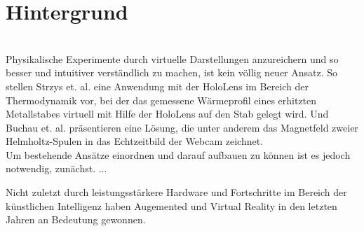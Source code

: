 \section{Hintergrund}
\label{sec-2}
\\


Physikalische Experimente durch virtuelle Darstellungen anzureichern und so besser und intuitiver verständlich zu machen, ist kein völlig neuer Ansatz. So stellen Strzys et. al. eine Anwendung mit der HoloLens im Bereich der Thermodynamik vor, bei der das gemessene Wärmeprofil eines erhitzten Metallstabes virtuell mit Hilfe der HoloLens auf den Stab gelegt wird. \cite{Strzys17} Und Buchau et. al. präsentieren eine Lösung, die unter anderem das Magnetfeld zweier Helmholtz-Spulen in das Echtzeitbild der Webcam zeichnet. \cite{Buchau09}\\

Um bestehende Ansätze einordnen und darauf aufbauen zu können ist es jedoch notwendig, zunächst. ...


Nicht zuletzt durch leistungsstärkere Hardware und Fortschritte im Bereich der künstlichen Intelligenz haben Augemented und Virtual Reality in den letzten Jahren an Bedeutung gewonnen. 